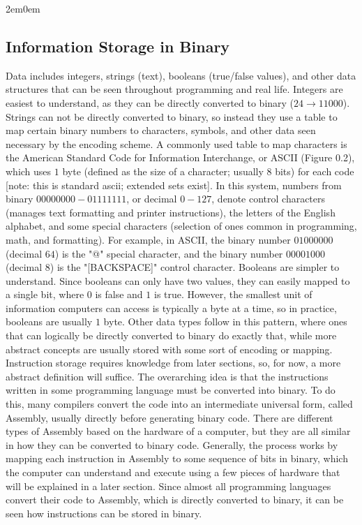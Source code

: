\documentclass[openany, 12px]{book}
\begin{document}
\begin{adjustwidth}{2em}{0em}
\subsection{Information Storage in Binary}
Data includes integers, strings (text), booleans (true/false values), and other data structures that can be seen throughout programming and real life. Integers are easiest to understand, as they can be directly converted to binary ($24 \rightarrow 11000$). Strings can not be directly converted to binary, so instead they use a table to map certain binary numbers to characters, symbols, and other data seen necessary by the encoding scheme. A commonly used table to map characters is the American Standard Code for Information Interchange, or ASCII (Figure 0.2), which uses $1$ byte (defined as the size of a character; usually $8$ bits) for each code [note: this is standard ascii; extended sets exist]. In this system, numbers from binary $00000000-01111111$, or decimal $0-127$, denote control characters (manages text formatting and printer instructions), the letters of the English alphabet, and some special characters (selection of ones common in programming, math, and formatting). For example, in ASCII, the binary number $01000000$ (decimal $64$) is the "@" special character, and the binary number $00001000$ (decimal $8$) is the "[BACKSPACE]" control character. Booleans are simpler to understand. Since booleans can only have two values, they can easily mapped to a single bit, where $0$ is false and $1$ is true. However, the smallest unit of information computers can access is typically a byte at a time, so in practice, booleans are usually $1$ byte. Other data types follow in this pattern, where ones that can logically be directly converted to binary do exactly that, while more abstract concepts are usually stored with some sort of encoding or mapping. \\

Instruction storage requires knowledge from later sections, so, for now, a more abstract definition will suffice. The overarching idea is that the instructions written in some programming language must be converted into binary. To do this, many compilers convert the code into an intermediate universal form, called Assembly, usually directly before generating binary code. There are different types of Assembly based on the hardware of a computer, but they are all similar in how they can be converted to binary code. Generally, the process works by mapping each instruction in Assembly to some sequence of bits in binary, which the computer can understand and execute using a few pieces of hardware that will be explained in a later section. Since almost all programming languages convert their code to Assembly, which is directly converted to binary, it can be seen how instructions can be stored in binary.
\\\\
\end{adjustwidth}
\end{document}
